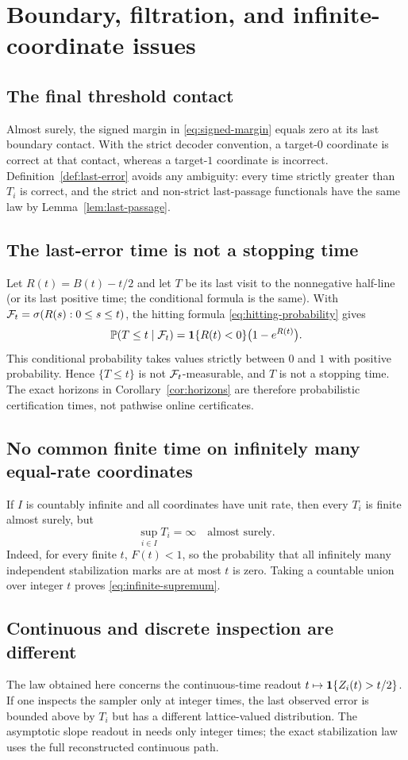 \section{Boundary, filtration, and infinite-coordinate issues}

\subsection{The final threshold contact}
Almost surely, the signed margin in \eqref{eq:signed-margin} equals zero at its
last boundary contact.  With the strict decoder convention, a target-$0$
coordinate is correct at that contact, whereas a target-$1$ coordinate is
incorrect.  Definition~\ref{def:last-error} avoids any ambiguity: every time
strictly greater than $T_i$ is correct, and the strict and non-strict
last-passage functionals have the same law by Lemma~\ref{lem:last-passage}.

\subsection{The last-error time is not a stopping time}
Let $R(t)=B(t)-t/2$ and let $T$ be its last visit to the nonnegative half-line
(or its last positive time; the conditional formula is the same).  With
$\mathcal{F}_t=\sigma(R(s):0\le s\le t)$, the hitting formula
\eqref{eq:hitting-probability} gives
\begin{equation}\label{eq:conditional-certificate}
  \mathbb{P}(T\le t\mid\mathcal{F}_t)
  =\mathbf{1}\{R(t)<0\}\bigl(1-e^{R(t)}\bigr).
\end{equation}
This conditional probability takes values strictly between $0$ and $1$ with
positive probability.  Hence $\{T\le t\}$ is not $\mathcal{F}_t$-measurable, and $T$
is not a stopping time.  The exact horizons in
Corollary~\ref{cor:horizons} are therefore probabilistic certification times,
not pathwise online certificates.

\subsection{No common finite time on infinitely many equal-rate coordinates}
If $I$ is countably infinite and all coordinates have unit rate, then every
$T_i$ is finite almost surely, but
\begin{equation}\label{eq:infinite-supremum}
  \sup_{i\in I}T_i=\infty
  \quad\text{almost surely}.
\end{equation}
Indeed, for every finite $t$, $F(t)<1$, so the probability that all infinitely
many independent stabilization marks are at most $t$ is zero.  Taking a
countable union over integer $t$ proves \eqref{eq:infinite-supremum}.

\subsection{Continuous and discrete inspection are different}
The law obtained here concerns the continuous-time readout
$t\mapsto\mathbf{1}\{Z_i(t)>t/2\}$.  If one inspects the sampler only at integer times,
the last observed error is bounded above by $T_i$ but has a different
lattice-valued distribution.  The asymptotic slope readout in
\cite{OpenAI2026FUSF} needs only integer times; the exact stabilization law
uses the full reconstructed continuous path.
